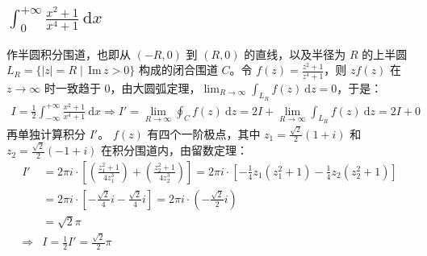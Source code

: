 \documentclass[UTF8]{report}
\def\Im{\mathrm{\,Im\,}}
\theoremstyle{MyLineTheoremStyle} %
\theoremstyle{MyBlockTheoremStyle} %
\theoremstyle{MySubsubsectionStyle} %
\begin{document}
\subsection{$\displaystyle \int_{0}^{+\infty} \frac{x^2 + 1}{x^4 + 1} \ \mathrm{d}x$}
作半圆积分围道，也即从 $(-R, 0)$ 到 $(R, 0)$ 的直线，以及半径为 $R$ 的上半圆 $L_R = \{| z | = R \mid \Im z > 0\}$ 构成的闭合围道 $C$。令 $f(z) = \frac{z^2 + 1}{z^4 + 1}$，则 $zf(z)$ 在 $z \to \infty$ 时一致趋于 0，由大圆弧定理，$\lim_{R \to \infty}\int_{L_R} f(z) \ \mathrm{d}z = 0$，于是：
\begin{gather}
I = \frac{1}{2} \int_{-\infty}^{+\infty}\frac{x^2 + 1}{x^4 + 1}\ \mathrm{d}x
\Longrightarrow 
I' = \lim_{R \to \infty}\oint_{C} f(z) \ \mathrm{d}z = 
2 I + \lim_{R \to \infty}\int_{L_R} f(z) \ \mathrm{d}z
= 2I + 0
\end{gather}
再单独计算积分 $I'$。
$f(z)$ 有四个一阶极点，其中 $z_1 = \frac{\sqrt{2}}{2}(1 + i)$ 和 $z_2 = \frac{\sqrt{2}}{2}(-1 + i)$ 在积分围道内，由留数定理：
\begin{align}
I' &= 2\pi i \cdot \left[ \left(\frac{z_1^2 + 1}{4z_1^3}\right) +  \left(\frac{z_2^2 + 1}{4z_2^3}\right)\right]
= 2\pi i \cdot \left[ -\frac{1}{4}z_1(z_1^2 + 1) -\frac{1}{4}z_2(z_2^2 + 1)\right] \\
&= 2\pi i \cdot \left[ -\frac{\sqrt{2}}{4}i -\frac{\sqrt{2}}{4}i\right] = 2 \pi i \cdot \left(- \frac{\sqrt{2}}{2} i\right) \\
&= \sqrt{2}\pi \\ 
\Longrightarrow & \boxed{I = \frac{1}{2}I' = \frac{\sqrt{2}}{2}\pi}
\end{align}
\end{document}
